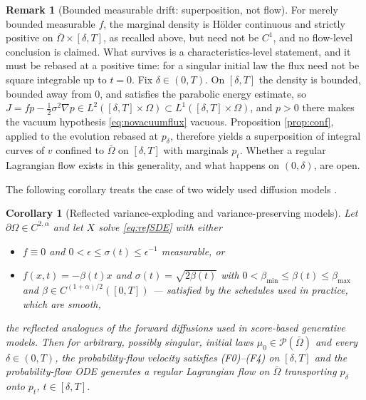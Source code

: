 \documentclass[11pt]{amsart}
\newtheorem{corollary}[theorem]{Corollary}
\theoremstyle{definition}
\newtheorem{remark}[theorem]{Remark}
\newcommand{\PP}{\mathcal{P}}
\begin{document}
\begin{remark}[Bounded measurable drift: superposition, not flow]
\label{rem:rough}
For merely bounded measurable $f$, the marginal density is H\"older
continuous and strictly positive on $\bar\Omega\times[\delta,T]$, as
recalled above, but need not be $C^1$, and no flow-level conclusion
is claimed. What survives is a characteristics-level statement, and
it must be rebased at a positive time: for a singular initial law
the flux need not be square integrable up to $t=0$. Fix
$\delta\in(0,T)$. On $[\delta,T]$ the density is bounded, bounded
away from $0$, and satisfies the parabolic energy estimate, so
$J=fp-\tfrac12\sigma^2\nabla p\in L^2([\delta,T]\times\Omega)\subset
L^1([\delta,T]\times\Omega)$, and $p>0$ there makes the vacuum
hypothesis \eqref{eq:novacuumflux} vacuous. Proposition
\ref{prop:conf}, applied to the evolution rebased at $p_\delta$,
therefore yields a superposition of integral curves of $v$ confined
to $\bar\Omega$ on $[\delta,T]$ with marginals $p_t$. Whether a
regular Lagrangian flow exists in this generality, and what happens
on $(0,\delta)$, are open.
\end{remark}
The following corollary treats the case of two widely used diffusion models \cite{Song2021}.
\begin{corollary}[Reflected variance-exploding and variance-preserving
models]\label{cor:vpve}
Let $\partial\Omega\in C^{2,\alpha}$ and let $X$ solve
\eqref{eq:refSDE} with either
\begin{itemize}
\item[\textup{(VE)}] $f\equiv0$ and $0<\epsilon\le\sigma(t)\le
\epsilon^{-1}$ measurable, or
\item[\textup{(VP)}] $f(x,t)=-\beta(t)x$ and $\sigma(t)=
\sqrt{2\beta(t)}$ with $0<\beta_{\min}\le\beta(t)\le\beta_{\max}$
and $\beta\in C^{(1+\alpha)/2}([0,T])$ --- satisfied by the
schedules used in practice, which are smooth,
\end{itemize}
the reflected analogues of the forward diffusions used in
score-based generative models. Then for \emph{arbitrary}, possibly
singular, initial laws $\mu_0\in\PP(\bar\Omega)$ and every
$\delta\in(0,T)$, the probability-flow velocity satisfies
\textup{(F0)--(F4)} on $[\delta,T]$ and the probability-flow ODE
generates a regular Lagrangian flow on $\bar\Omega$ transporting
$p_\delta$ onto $p_t$, $t\in[\delta,T]$.
\end{corollary}
\end{document}
